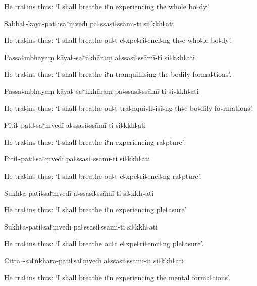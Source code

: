 \begin{english}
  He tra꜕ins thus: `I shall breathe i꜓n experiencing the whole bo꜕dy'.
\end{english}

Sabba꜕-kāya-pat꜕isa꜓ṃvedī pa꜕ssasi꜕ssāmī-ti si꜕kkh꜕ati

\begin{english}
  He tra꜕ins thus: `I shall breathe ou꜕t e꜕xpe꜕ri꜕enci꜕ng th꜕e who꜕le bo꜕dy'.
\end{english}

Passa꜕mbhayaṃ kāya꜕-sa꜓ṅkhāraṃ a꜕ssasi꜕ssāmī-ti si꜕kkh꜕ati

\begin{english}
  He tra꜕ins thus: `I shall breathe i꜓n tranquillising the bodily forma꜕tions'.
\end{english}

Passa꜕mbhayaṃ kāya꜕-sa꜓ṅkhāraṃ pa꜕ssasi꜕ssāmī-ti si꜕kkh꜕ati

\begin{english}
  He tra꜕ins thus: `I shall breathe ou꜕t tra꜕nqui꜕ll꜕isi꜕ng th꜕e bo꜕dily fo꜕rmations'.
\end{english}

Pīti꜕-pati꜕sa꜓ṃvedī a꜕ssasi꜕ssāmī-ti si꜕kkh꜕ati

\begin{english}
  He tra꜕ins thus: `I shall breathe i꜓n experiencing ra꜕pture'.
\end{english}

Pīti꜕-pati꜕sa꜓ṃvedī pa꜕ssasi꜕ssāmī-ti si꜕kkh꜕ati

\begin{english}
  He tra꜕ins thus: `I shall breathe ou꜕t e꜕xpe꜕ri꜕enci꜕ng ra꜕pture'.
\end{english}

Sukh꜕a-pati꜕sa꜓ṃvedī a꜕ssasi꜕ssāmī-ti si꜕kkh꜕ati

\begin{english}
  He tra꜕ins thus: `I shall breathe i꜓n experiencing ple꜕asure'
\end{english}

Sukh꜕a-pati꜕sa꜓ṃvedī pa꜕ssasi꜕ssāmī-ti si꜕kkh꜕ati

\begin{english}
  He tra꜕ins thus: `I shall breathe ou꜕t e꜕xpe꜕ri꜕enci꜕ng ple꜕asure'.
\end{english}

Citta꜕-sa꜓ṅkhāra-pati꜕sa꜓ṃvedī a꜕ssasi꜕ssāmī-ti si꜕kkh꜕ati

\begin{english}
  He tra꜕ins thus: `I shall breathe i꜓n experiencing the mental forma꜕tions'.
\end{english}

